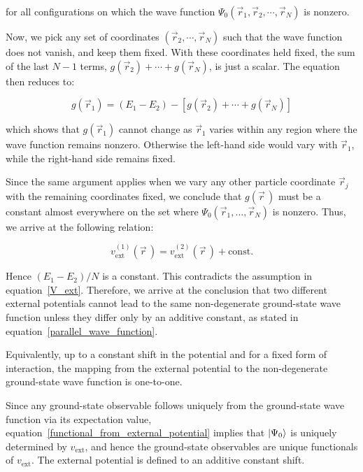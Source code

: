 for all configurations on which the wave function $\Psi_0(\vec{r}_1,\vec{r}_2,\cdots,\vec{r}_N)$ is nonzero.

Now, we pick any set of coordinates $(\vec{r}_2,\cdots,\vec{r}_N)$ such that the wave function does not vanish, and keep them fixed.
With these coordinates held fixed, the sum of the last $N-1$ terms,
$g(\vec{r}_2)+\cdots+g(\vec{r}_N)$, is just a scalar.
The equation then reduces to:

\begin{equation}
    g(\vec{r}_1)= (E_1-E_2)-\left[g(\vec{r}_2)+\cdots+g(\vec{r}_N)\right]
\label{fixed_N-body_shift_potential}
\end{equation}

which shows that $g(\vec{r}_1)$ cannot change as $\vec{r}_1$ varies within any region where the wave function remains nonzero.
Otherwise the left-hand side would vary with $\vec{r}_1$, while the right-hand side remains fixed.

Since the same argument applies when we vary any other particle coordinate $\vec{r}_j$ with the remaining coordinates fixed,
we conclude that $g(\vec{r}\,)$ must be a constant almost everywhere on the set where $\Psi_0(\vec{r}_1,\ldots,\vec{r}_N)$ is nonzero.
Thus, we arrive at the following relation:

\begin{equation}
    v_\mathrm{ext}^{(1)}(\vec{r}\,)=v_\mathrm{ext}^{(2)}(\vec{r}\,)+\mathrm{const.}
\label{parallel_wave_function}
\end{equation}

Hence $(E_1-E_2)/N$ is a constant. This contradicts the assumption in equation~\eqref{V_ext}.
Therefore, we arrive at the conclusion that two different external potentials cannot lead to the same non-degenerate ground-state wave function unless they differ only by an additive constant, as stated in equation~\eqref{parallel_wave_function}.

Equivalently, up to a constant shift in the potential and for a fixed form of interaction, the mapping from the external potential to the non-degenerate ground-state wave function is one-to-one.

Since any ground-state observable follows uniquely from the ground-state wave function via its expectation value, equation~\eqref{functional_from_external_potential} implies that $\ket{\Psi_0}$ is uniquely determined by $v_\mathrm{ext}$, and hence the ground-state observables are unique functionals of $v_\mathrm{ext}$.
The external potential is defined to an additive constant shift.

